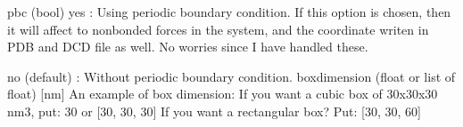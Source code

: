 \documentclass[letterpaper,10pt,english]{sphinxmanual}
\begin{document}
\begin{sphinxVerbatim}[commandchars=\\\{\}]
pbc         (bool)
            yes : Using periodic boundary condition.
                    If this option is chosen, then it will affect to non\PYGZhy{}bonded forces in the system,
                    and the coordinate writen in PDB and DCD file as well. No worries since I have handled these.

            no (default) : Without periodic boundary condition.
\PYGZhy{}\PYGZhy{}\PYGZhy{}\PYGZhy{}\PYGZhy{}\PYGZhy{}\PYGZhy{}\PYGZhy{}\PYGZhy{}\PYGZhy{}\PYGZhy{}\PYGZhy{}\PYGZhy{}\PYGZhy{}\PYGZhy{}\PYGZhy{}\PYGZhy{}\PYGZhy{}\PYGZhy{}\PYGZhy{}\PYGZhy{}\PYGZhy{}\PYGZhy{}\PYGZhy{}\PYGZhy{}\PYGZhy{}\PYGZhy{}\PYGZhy{}\PYGZhy{}\PYGZhy{}\PYGZhy{}\PYGZhy{}\PYGZhy{}\PYGZhy{}\PYGZhy{}\PYGZhy{}\PYGZhy{}\PYGZhy{}\PYGZhy{}\PYGZhy{}\PYGZhy{}\PYGZhy{}\PYGZhy{}\PYGZhy{}\PYGZhy{}\PYGZhy{}\PYGZhy{}\PYGZhy{}\PYGZhy{}\PYGZhy{}\PYGZhy{}\PYGZhy{}\PYGZhy{}\PYGZhy{}\PYGZhy{}\PYGZhy{}\PYGZhy{}\PYGZhy{}\PYGZhy{}\PYGZhy{}\PYGZhy{}\PYGZhy{}\PYGZhy{}\PYGZhy{}\PYGZhy{}\PYGZhy{}\PYGZhy{}\PYGZhy{}\PYGZhy{}\PYGZhy{}\PYGZhy{}\PYGZhy{}\PYGZhy{}\PYGZhy{}\PYGZhy{}\PYGZhy{}\PYGZhy{}\PYGZhy{}\PYGZhy{}\PYGZhy{}\PYGZhy{}\PYGZhy{}\PYGZhy{}\PYGZhy{}
box\PYGZus{}dimension   (float or list of float)
            [nm] An example of box dimension:
            If you want a cubic box of 30x30x30 nm\PYGZca{}3, put: 30 or [30, 30, 30]
            If you want a rectangular box? Put:  [30, 30, 60]
\end{sphinxVerbatim}
\end{document}
